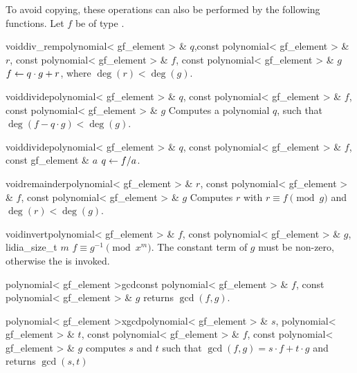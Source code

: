 To avoid copying, these operations can also be performed by the following functions.  Let $f$ be
of type .

\begin{fcode}{void}{div_rem}{polynomial< gf_element > & $q$,const polynomial< gf_element > & $r$,
    const polynomial< gf_element > & $f$, const polynomial< gf_element > & $g$}%
  $f \leftarrow q \cdot g + r$, where $\deg(r) < \deg(g)$.
\end{fcode}

\begin{fcode}{void}{divide}{polynomial< gf_element > & $q$,
    const polynomial< gf_element > & $f$, const polynomial< gf_element > & $g$}%
  Computes a polynomial $q$, such that $\deg(f - q \cdot g) < \deg(g)$.
\end{fcode}

\begin{fcode}{void}{divide}{polynomial< gf_element > & $q$, const polynomial< gf_element > & $f$,
    const gf_element & $a$}%
  $q \leftarrow f / a$.
\end{fcode}

\begin{fcode}{void}{remainder}{polynomial< gf_element > & $r$,
    const polynomial< gf_element > & $f$, const polynomial< gf_element > & $g$}%
  Computes $r$ with $r \equiv f \pmod{g}$ and $\deg(r) < \deg(g)$.
\end{fcode}

\begin{fcode}{void}{invert}{polynomial< gf_element > & $f$, const polynomial< gf_element > & $g$,
    lidia_size_t $m$}%
  $f \equiv g^{-1} \pmod{x^m}$.  The constant term of $g$ must be non-zero, otherwise the \LEH
  is invoked.
\end{fcode}



\begin{fcode}{polynomial< gf_element >}{gcd}{const polynomial< gf_element > & $f$,
    const polynomial< gf_element > & $g$}%
  returns $\gcd(f, g)$.
\end{fcode}

\begin{fcode}{polynomial< gf_element >}{xgcd}{polynomial< gf_element > & $s$,
    polynomial< gf_element > & $t$, const polynomial< gf_element > & $f$, const polynomial< gf_element > & $g$}%
  computes $s$ and $t$ such that $\gcd(f, g) = s \cdot f + t \cdot g$ and returns $\gcd(s, t)$
\end{fcode}


